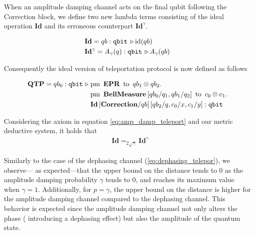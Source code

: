 When an amplitude damping channel acts on the final qubit following the Correction block, we define two new lambda terms consisting of the ideal operation \textbf{Id} and its erroneous counterpart  $\textbf{Id}^{\gamma}$.

\begin{align}\label{eq:id_error_teleport}
  &\textbf{Id} = qb:\mathtt{qbit} \, \triangleright \mathrm{id} (qb) \\
  & \textbf{Id}^{\gamma} = A_{\gamma} (q):\mathtt{qbit} \, \triangleright  A_{\gamma} (qb)
\end{align}


Consequently the ideal version of teleportation protocol is now defined as follows

\begin{align*} 
  \textbf{QTP} = qb_{0}: \mathtt{qbit}\hspace{3 pt} \triangleright \hspace{3 pt} & \text{pm} \hspace{5pt} \textbf{EPR} \hspace{5pt} \text{to} \hspace{5pt}  qb_{1} \otimes qb_{2}.  \notag \\
     & \text{pm}\hspace{5pt} \textbf{BellMeasure}\, [qb_0/q_1,qb_{1}/q_2] \hspace{5pt}  \text{to} \hspace{5pt} c_{0}\otimes c_{1} . \notag \\
     & \textbf{Id} \, [ \textbf{Correction}/qb] \, [qb_{2}/q,c_{0}/x, c_{1}/y] 
     : \mathtt{qbit}  
 \end{align*}

 Considering the axiom in equation \eqref{eq:amp_damp_teleport} and our metric deductive system, it holds that 
\begin{align*}
  &\textbf{Id}=_{2 \sqrt{\gamma}} \textbf{Id}^{\gamma}
\end{align*}

Similarly to the case of the dephasing channel (\autoref{eq:dephasing_telepor}), we observe--- as expected---that the upper bound on the distance tends to $0$ as the amplitude damping probability $\gamma$ tends to $0$, and reaches its maximum value when $\gamma = 1$. 
Additionally, for $p = \gamma$, the upper bound on the distance is higher for the amplitude damping channel compared to the dephasing channel. This behavior is expected since the amplitude damping channel not only alters the phase ( introducing a dephasing effect) but also the amplitude of the quantum state.
\vspace{5pt}

